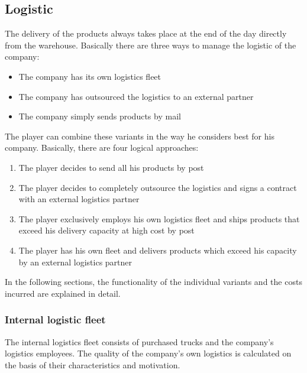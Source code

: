 \subsection{Logistic}
The delivery of the products always takes place at the end of the day directly from the warehouse. Basically there are three ways to manage the logistic of the company: 
\begin{itemize}
    \item The company has its own logistics fleet
    \item The company has outsourced the logistics to an external partner
    \item The company simply sends products by mail
\end{itemize}

The player can combine these variants in the way he considers best for his company.  
Basically, there are four logical approaches:
\begin{enumerate}
    \item The player decides to send all his products by post 
    \item The player decides to completely outsource the logistics and signs a contract with an external logistics partner
    \item The player exclusively employs his own logistics fleet and ships products that exceed his delivery capacity at high cost by post
    \item The player has his own fleet and delivers products which exceed his capacity by an external logistics partner
\end{enumerate}
	
In the following sections, the functionality of the individual variants and the costs incurred are explained in detail.


\subsubsection{Internal logistic fleet}
The internal logistics fleet consists of purchased trucks and the company's logistics employees. The quality of the company's own logistics is calculated on the basis of their characteristics and motivation.


